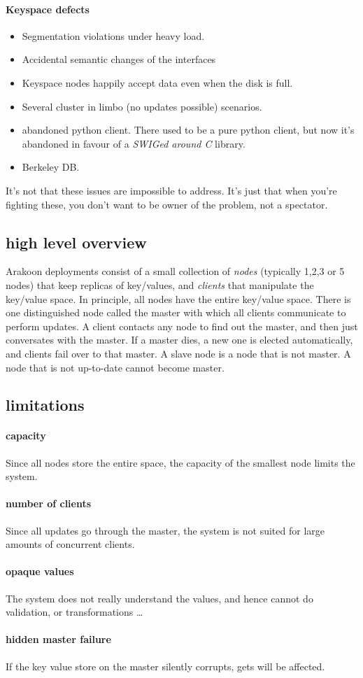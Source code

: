 \paragraph{Keyspace defects}
\begin{itemize}

\item{} Segmentation violations under heavy load.
\item{} Accidental semantic changes of the interfaces
\item{} Keyspace nodes happily accept data even when the disk is full.
\item{} Several cluster in limbo (no updates possible) scenarios.
\item{} abandoned python client. There used to be a pure python client, 
but now it's abandoned in favour of a \emph{SWIGed around C} library. 
\item{} Berkeley DB. 

\end{itemize}
It's not that these issues are impossible to address. It's just that when you're fighting these, you don't want to be owner of the problem, not a spectator.
\subsection{high level overview}
Arakoon deployments consist of a small collection of \emph{nodes} (typically 1,2,3 or 5 nodes) that keep replicas of key/values, and \emph{clients} that manipulate the key/value space.
In principle, all nodes have the entire key/value space.
There is one distinguished node called the master with which all clients communicate to perform updates.
A client contacts any node to find out the master, and then just conversates with the master.
If a master dies, a new one is elected automatically, and clients fail over to that master.
A slave node is a node that is not master.
A node that is not up-to-date cannot become master.

\subsection{limitations}
\paragraph{capacity}
Since all nodes store the entire space, the capacity of the smallest node limits the system.
\paragraph{number of clients}
Since all updates go through the master, the system is not suited for large amounts of concurrent clients.
\paragraph{opaque values}
The system does not really understand the values, and hence cannot do validation, or transformations \ldots
\paragraph{hidden master failure}
If the key value store on the master silently corrupts, gets will be affected.

